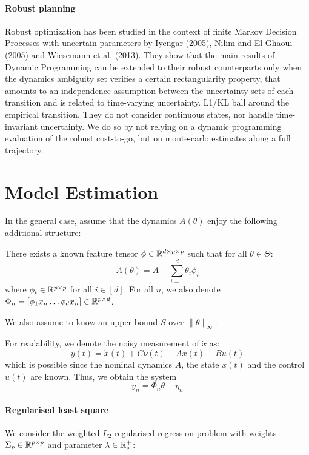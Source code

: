 \documentclass{article}
\begin{document}
\paragraph{Robust planning}
Robust optimization has been studied in the context of finite Markov Decision Processes with uncertain parameters by Iyengar (2005), Nilim and El Ghaoui (2005) and Wiesemann et al. (2013). They show that the main results of Dynamic Programming can be extended to their robust counterparts only when the dynamics ambiguity set verifies a certain rectangularity property, that amounts to an independence assumption between the uncertainty sets of each transition and is related to time-varying uncertainty.
L1/KL ball around the empirical transition.
They do not consider continuous states, nor handle time-invariant uncertainty. We do so by not relying on a dynamic programming evaluation of the robust cost-to-go, but on monte-carlo estimates along a full trajectory.

\section{Model Estimation}

\label{sec:estimation}

In the general case, 
 assume that the dynamics $A(\theta)$ enjoy the following additional structure:
\begin{assumption}[Structure]
\label{assumpt:structure}
There exists a known feature tensor $\phi\in \mathbb{R}^{d \times p \times p}$ such that for all $\theta\in\Theta$:
\begin{equation}
    A(\theta) = A + %
    \sum_{i=1}^d \theta_i\phi_i
\end{equation}
where $\phi_i\in\mathbb{R}^{p\times p}$ for all $i\in[d]$. For all $n$, we also denote $\Phi_n = [\phi_1 x_n \dots \phi_d x_n]\in\mathbb{R}^{p\times d}$.

We also assume to know an upper-bound $S$ over $\|\theta\|_\infty$.
\end{assumption}

For readability, we denote the noisy measurement of $\dot{x}$ as:
\begin{equation}
\label{eq:measurement}
    y(t) = \dot{x}(t) + C\nu(t) - A x(t) - Bu(t)
\end{equation}
which is possible since the nominal dynamics $A$, the state $x(t)$ and the control $u(t)$ are known.
Thus, we obtain the system
\[
y_n = \Phi_n\theta + \eta_n
\]

\paragraph{Regularised least square} We consider the weighted $L_2$-regularised regression problem with weights  $\Sigma_p\in\mathbb{R}^{p\times p}$ and parameter $\lambda\in\mathbb{R}^+_*$:
\end{document}
